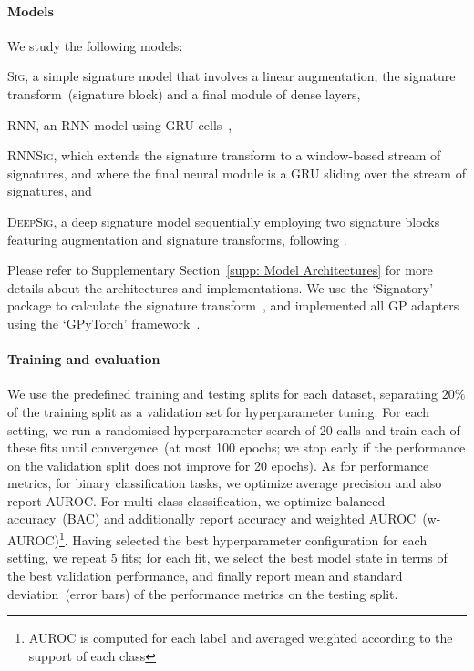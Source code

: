 \documentclass{article}
\begin{document}
\paragraph{Models}
%
We study the following models:
\begin{inparaenum}[(1)]
  \item \textsc{Sig}, a simple signature model that involves a linear
    augmentation, the signature transform~(signature block) and a final
    module of dense layers,
  \item \textsc{RNN}, an RNN model using GRU cells~\citep{cho2014learning},
  \item \textsc{RNNSig}, which extends the signature transform to a window-based
    stream of signatures, and where the final neural module is a GRU
    sliding over the stream of signatures, and
  \item \textsc{DeepSig}, a deep signature model sequentially employing two signature blocks featuring augmentation and signature transforms,
  following \citet{kidger2019deep}.
\end{inparaenum}
%
Please refer to Supplementary Section~\ref{supp: Model Architectures} for more details about the
architectures and implementations. We use the `Signatory' package to
calculate the signature transform~\citep{signatory}, and implemented all GP
adapters using the `GPyTorch' framework~\citep{gardner2018gpytorch}.

\paragraph{Training and evaluation}
%
We use the predefined training and testing splits for each dataset,
separating $20\%$ of the training split as a validation set for
hyperparameter tuning.
%
For each setting, we run a randomised hyperparameter search of $20$
calls and train each of these fits until convergence~(at most 100
epochs; we stop early if the performance on the validation
split does not improve for 20 epochs). As for performance metrics, for
binary classification tasks, we optimize average precision and also report AUROC. For multi-class
classification, we optimize balanced accuracy~(BAC) and additionally
report accuracy and weighted AUROC~(w-AUROC)\footnote{%
  AUROC is computed for each label and averaged weighted according to
  the support of each class%
}.
%
Having selected the best hyperparameter configuration for each setting,
we repeat $5$ fits; for each fit, we select the best model state in
terms of the best validation performance, and finally report mean and
standard deviation~(error bars) of the performance metrics on the
testing split.
\end{document}
